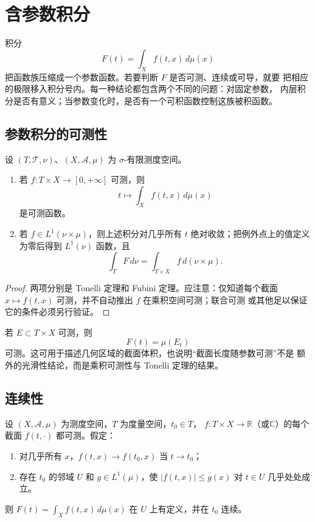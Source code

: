 \chapter{含参数积分}
\label{chap:parameter-integrals}

积分
\[
 F(t)=\int_X f(t,x)\,d\mu(x)
\]
把函数族压缩成一个参数函数。若要判断 \(F\) 是否可测、连续或可导，就要
把相应的极限移入积分号内。每一种结论都包含两个不同的问题：对固定参数，
内层积分是否有意义；当参数变化时，是否有一个可积函数控制这族被积函数。

\section{参数积分的可测性}

\begin{theorem}
\label{thm:parameter-integral-measurable}
设 \((T,\mathcal T,\nu)\)、\((X,\mathcal A,\mu)\) 为
\(\sigma\)-有限测度空间。
\begin{enumerate}[label=\textup{(\roman*)}]
 \item 若 \(f:T\times X\to[0,+\infty]\) 可测，则
 \[
  t\longmapsto\int_Xf(t,x)\,d\mu(x)
 \]
 是可测函数。
 \item 若 \(f\in L^1(\nu\times\mu)\)，则上述积分对几乎所有 \(t\)
 绝对收敛；把例外点上的值定义为零后得到 \(L^1(\nu)\) 函数，且
 \[
  \int_TF\,d\nu=\int_{T\times X}f\,d(\nu\times\mu).
 \]
\end{enumerate}
\end{theorem}

\begin{proof}
两项分别是 Tonelli 定理和 Fubini 定理。应注意：仅知道每个截面
\(x\mapsto f(t,x)\) 可测，并不自动推出 \(f\) 在乘积空间可测；联合可测
或其他足以保证它的条件必须另行验证。
\end{proof}

\begin{example}
若 \(E\subset T\times X\) 可测，则
\[
 F(t)=\mu(E_t)
\]
可测。这可用于描述几何区域的截面体积，也说明“截面长度随参数可测”不是
额外的光滑性结论，而是乘积可测性与 Tonelli 定理的结果。
\end{example}

\section{连续性}

\begin{theorem}[参数积分的连续性]
\label{thm:parameter-integral-continuity}
设 \((X,\mathcal A,\mu)\) 为测度空间，\(T\) 为度量空间，\(t_0\in T\)，
\(f:T\times X\to\mathbb R\)（或\(\mathbb C\)）的每个截面
\(f(t,\cdot)\) 都可测。假定：
\begin{enumerate}[label=\textup{(\roman*)}]
 \item 对几乎所有 \(x\)，\(f(t,x)\to f(t_0,x)\) 当 \(t\to t_0\)；
 \item 存在 \(t_0\) 的邻域 \(U\) 和 \(g\in L^1(\mu)\)，使
 \(|f(t,x)|\le g(x)\) 对 \(t\in U\) 几乎处处成立。
\end{enumerate}
则 \(F(t)=\int_Xf(t,x)\,d\mu(x)\) 在 \(U\) 上有定义，并在 \(t_0\) 连续。
\end{theorem}

